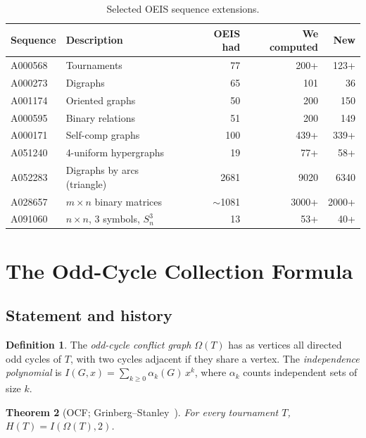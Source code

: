 \documentclass[12pt,reqno]{amsart}
\theoremstyle{plain}
\newtheorem{theorem}{Theorem}[section]
\theoremstyle{definition}
\newtheorem{definition}[theorem]{Definition}
\theoremstyle{remark}
\begin{document}
\begin{table}[ht]
\centering
\caption{Selected OEIS sequence extensions.}\label{tab:oeis}
\begin{tabular}{@{}llrrr@{}}
\toprule
Sequence & Description & OEIS had & We computed & New \\
\midrule
A000568 & Tournaments & 77 & 200+ & 123+ \\
A000273 & Digraphs & 65 & 101 & 36 \\
A001174 & Oriented graphs & 50 & 200 & 150 \\
A000595 & Binary relations & 51 & 200 & 149 \\
A000171 & Self-comp graphs & 100 & 439+ & 339+ \\
A051240 & 4-uniform hypergraphs & 19 & 77+ & 58+ \\
A052283 & Digraphs by arcs (triangle) & 2681 & 9020 & 6340 \\
A028657 & $m \times n$ binary matrices & $\sim$1081 & 3000+ & 2000+ \\
A091060 & $n \times n$, 3 symbols, $S_n^3$ & 13 & 53+ & 40+ \\
\bottomrule
\end{tabular}
\end{table}

\section{The Odd-Cycle Collection Formula}\label{sec:ocf}

\subsection{Statement and history}

\begin{definition}
The \emph{odd-cycle conflict graph} $\Omega(T)$ has as vertices all directed
odd cycles of $T$, with two cycles adjacent if they share a vertex. The
\emph{independence polynomial} is $I(G, x) = \sum_{k \geq 0} \alpha_k(G) \, x^k$,
where $\alpha_k$ counts independent sets of size $k$.
\end{definition}

\begin{theorem}[OCF; Grinberg--Stanley~\cite{GrinbergStanley2024}]\label{thm:ocf}
For every tournament $T$, $H(T) = I(\Omega(T), 2)$.
\end{theorem}
\end{document}
